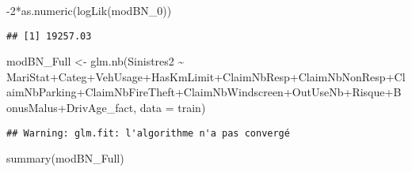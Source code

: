 \documentclass[
]{article}
\newenvironment{Shaded}{\begin{snugshade}}{\end{snugshade}}
\newcommand{\AttributeTok}[1]{\textcolor[rgb]{0.77,0.63,0.00}{#1}}
\newcommand{\DecValTok}[1]{\textcolor[rgb]{0.00,0.00,0.81}{#1}}
\newcommand{\FunctionTok}[1]{\textcolor[rgb]{0.00,0.00,0.00}{#1}}
\newcommand{\NormalTok}[1]{#1}
\newcommand{\OtherTok}[1]{\textcolor[rgb]{0.56,0.35,0.01}{#1}}
\newcommand{\SpecialCharTok}[1]{\textcolor[rgb]{0.00,0.00,0.00}{#1}}
\begin{document}
\begin{Shaded}
\begin{Highlighting}[]
\SpecialCharTok{{-}}\DecValTok{2}\SpecialCharTok{*}\FunctionTok{as.numeric}\NormalTok{(}\FunctionTok{logLik}\NormalTok{(modBN\_0))}
\end{Highlighting}
\end{Shaded}

\begin{verbatim}
## [1] 19257.03
\end{verbatim}

\begin{Shaded}
\begin{Highlighting}[]
\NormalTok{modBN\_Full }\OtherTok{\textless{}{-}} \FunctionTok{glm.nb}\NormalTok{(Sinistres2 }\SpecialCharTok{\textasciitilde{}}\NormalTok{ MariStat}\SpecialCharTok{+}\NormalTok{Categ}\SpecialCharTok{+}\NormalTok{VehUsage}\SpecialCharTok{+}\NormalTok{HasKmLimit}\SpecialCharTok{+}\NormalTok{ClaimNbResp}\SpecialCharTok{+}\NormalTok{ClaimNbNonResp}\SpecialCharTok{+}\NormalTok{ClaimNbParking}\SpecialCharTok{+}\NormalTok{ClaimNbFireTheft}\SpecialCharTok{+}\NormalTok{ClaimNbWindscreen}\SpecialCharTok{+}\NormalTok{OutUseNb}\SpecialCharTok{+}\NormalTok{Risque}\SpecialCharTok{+}\NormalTok{BonusMalus}\SpecialCharTok{+}\NormalTok{DrivAge\_fact, }\AttributeTok{data =}\NormalTok{ train)}
\end{Highlighting}
\end{Shaded}

\begin{verbatim}
## Warning: glm.fit: l'algorithme n'a pas convergé
\end{verbatim}

\begin{Shaded}
\begin{Highlighting}[]
\FunctionTok{summary}\NormalTok{(modBN\_Full)}
\end{Highlighting}
\end{Shaded}
\end{document}
